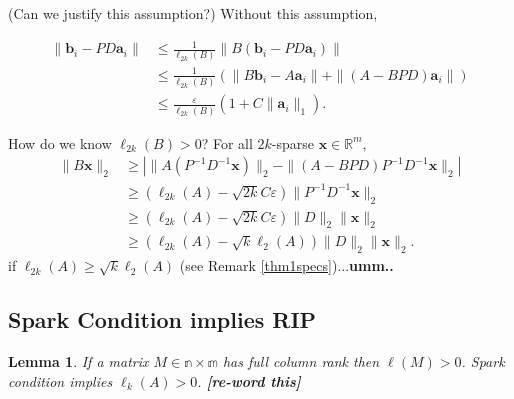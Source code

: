 \documentclass[journal, onecolumn]{IEEEtran}
\newtheorem{lemma}{Lemma}
\begin{document}
(Can we justify this assumption?) Without this assumption,

\begin{align*}
\|\mathbf{b}_i - PD\mathbf{a}_i\| 
&\leq \frac{1}{\ell_{2k}(B)}\|B(\mathbf{b}_i - PD\mathbf{a}_i)\| \\
&\leq \frac{1}{\ell_{2k}(B)} (\|B\mathbf{b}_i - A\mathbf{a}_i\| + \|(A - BPD)\mathbf{a}_i\|) \\
&\leq \frac{\varepsilon}{\ell_{2k}(B)}(1+C\|\mathbf{a}_i\|_1).
\end{align*}

How do we know $\ell_{2k}(B) > 0$? For all $2k$-sparse $\mathbf{x} \in \mathbb{R}^m$,
\begin{align*}
\|B\mathbf{x}\|_2 
&\geq | \|A(P^{-1}D^{-1}\mathbf{x})\|_2 - \|(A-BPD)P^{-1}D^{-1}\mathbf{x}\|_2 | \\
&\geq (\ell_{2k}(A) - \sqrt{2k}C\varepsilon)\|P^{-1}D^{-1}\mathbf{x}\|_2 \\
&\geq (\ell_{2k}(A) - \sqrt{2k}C\varepsilon)\|D\|_2\|\mathbf{x}\|_2 \\
&\geq (\ell_{2k}(A) - \sqrt{k}\ell_2(A))\|D\|_2\|\mathbf{x}\|_2. 
\end{align*}
%
if $\ell_{2k}(A) \geq \sqrt{k}\ell_2(A)$ (see Remark \ref{thm1specs})...\textbf{umm..} 

\subsection{Spark Condition implies RIP}

\begin{lemma}
If a matrix $M \in \mathbb{n \times m}$ has full column rank then $\ell(M) > 0$. Spark condition implies $\ell_k(A) > 0$. \textbf{[re-word this]}
\end{lemma}
\end{document}
